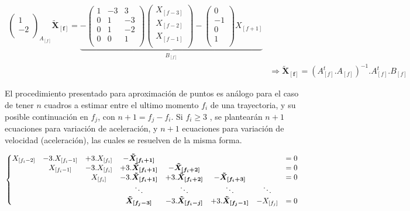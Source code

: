 {\begin{equation}
\begin{split}
{\begin{pmatrix}
1\\
-2\\
\end{pmatrix}
}_{A_{[f]}}\boldsymbol{\tilde{X}_{[f]}} = \underbrace{- \begin{pmatrix}
1 &-3 &3\\
0 &1 &-3\\
0 &1 &-2\\
0 &0 &1\\
\end{pmatrix}
\begin{pmatrix}
X_{[f-3]}\\
X_{[f-2]}\\
X_{[f-1]}\\
\end{pmatrix} - \begin{pmatrix}
0\\
-1\\
0\\
1\\
\end{pmatrix}
X_{[f+1]}}_{B_{[f]}} \\
&\Rightarrow \boldsymbol{\tilde{X}_{[f]}} = \left( A_{[f]}^{t}.A_{[f]}\right)^{-1}.A_{[f]}^{t}.B_{[f]}
\end{split}
\label{matrices_estimacion_01}
\end{equation}}

El procedimiento presentado para aproximación de puntos es análogo para el caso de tener $n$ cuadros a estimar entre el ultimo momento $f_{i}$ de una trayectoria, y su posible continuación en $f_{j}$, con $n+1=f_{j}-f_{i}$. Si $f_{i} \geq 3$ , se plantearán $n+1$ ecuaciones para variación de aceleración, y $n+1$ ecuaciones para variación de velocidad (aceleración), las cuales se resuelven de la misma forma. 

{\scriptsize \begin{equation}
\hspace{-0cm}
\left\{
\begin{matrix}
X_{[f_{i}-2]} &-3.X_{[f_{i}-1]} &+3.X_{[f_{i}]} &-\boldsymbol{\tilde{X}_{[f_{i}+1]}} & & & &=0 \\
& X_{[f_{i}-1]} &-3.X_{[f_{i}]} &+3.\boldsymbol{\tilde{X}_{[f_{i}+1]}} &-\boldsymbol{\tilde{X}_{[f_{i}+2]}} & & &=0 \\
& & X_{[f_{i}]} &-3.\boldsymbol{\tilde{X}_{[f_{i}+1]}} &+3.\boldsymbol{\tilde{X}_{[f_{i}+2]}} &-\boldsymbol{\tilde{X}_{[f_{i}+3]}}& &=0 \\
& & & \ddots & \ddots & \ddots & \ddots & \\
& & & \boldsymbol{\tilde{X}_{[f_{j}-3]}} &-3.\boldsymbol{\tilde{X}_{[f_{i}-j]}} &+3.\boldsymbol{\tilde{X}_{[f_{j}-1]}} &-X_{[f_{j}]} &=0 \\
\end{matrix}
\right.
\label{ecuaciones_estimacion_n}
\end{equation}}

